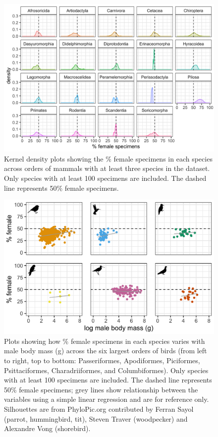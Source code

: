 \documentclass[a4paper, 12pt]{article}
\begin{document}
\begin{figure}
 \centering
  \includegraphics[width = \linewidth]{figures/orders-density-mammals-all.png}
  \caption{Kernel density plots showing the \% female specimens in each species across orders of mammals with at least three species in the dataset. 
  Only species with at least 100 specimens are included. 
  The dashed line represents 50\% female specimens.}
  \label{fig-mammal-orders}
\end{figure}

\begin{figure}
 \centering
  \includegraphics[width = \linewidth]{figures/mass-orders-birds.png}
  \caption{Plots showing how \% female specimens in each species varies with male body mass (g) across the six largest orders of birds (from left to right, top to bottom: Passeriformes, Apodiformes, Piciformes, Psittaciformes, Charadriiformes, and Columbiformes). 
  Only species with at least 100 specimens are included. 
  The dashed line represents 50\% female specimens; grey lines show relationship between the variables using a simple linear regression and are for reference only. 
  Silhouettes are from PhyloPic.org contributed by Ferran Sayol (parrot, hummingbird, tit), Steven Traver (woodpecker) and Alexandre Vong (shorebird).}
  \label{fig-bird-male-mass}
\end{figure}
\end{document}
